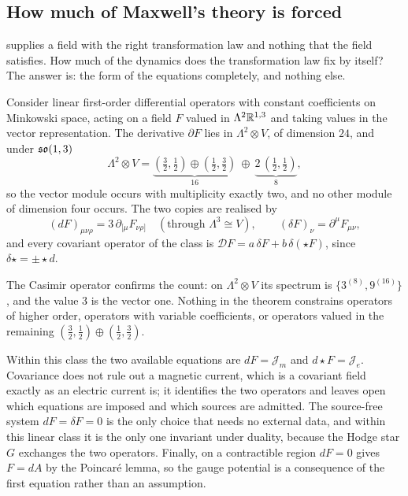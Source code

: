 \subsection{How much of Maxwell's theory is forced}
\label{sec:maxwell}

 supplies a field with the right transformation law and nothing that the field satisfies. How much of the
dynamics does the transformation law fix by itself? The answer is: the form of the equations completely, and nothing else.

\begin{theorem}
\label{thm:twoops}
Consider linear first-order differential operators with constant coefficients on Minkowski space, acting on a field $F$ valued in
$\Lambda^2\mathbb{R}^{1,3}$ and taking values in the vector representation. The derivative $\partial F$ lies in $\Lambda^2\otimes V$, of
dimension $24$, and under $\mathfrak{so}(1,3)$
\[
\Lambda^2\otimes V=\underbrace{(\tfrac32,\tfrac12)\oplus(\tfrac12,\tfrac32)}_{16}\ \oplus\ \underbrace{2\,(\tfrac12,\tfrac12)}_{8},
\]
so the vector module occurs with multiplicity exactly two, and no other module of dimension four occurs. The two copies are realised
by
\[
(dF)_{\mu\nu\rho}=3\,\partial_{[\mu}F_{\nu\rho]}\quad(\text{through }\Lambda^3\cong V),\qquad (\delta F)_\nu=\partial^\mu F_{\mu\nu},
\]
and every covariant operator of the class is $\mathcal DF=a\,\delta F+b\,\delta(\star F)$, since $\delta\star=\pm\star d$.
\end{theorem}

The Casimir operator confirms the count: on $\Lambda^2\otimes V$ its spectrum is $\{3^{(8)},9^{(16)}\}$, and the value $3$ is the
vector one. Nothing in the theorem constrains operators of higher order, operators with variable coefficients, or operators valued
in the remaining $(\tfrac32,\tfrac12)\oplus(\tfrac12,\tfrac32)$.

\begin{corollary}
\label{cor:maxwellform}
Within this class the two available equations are $dF=\mathcal J_m$ and $d\star F=\mathcal J_e$. Covariance does not rule out a
magnetic current, which is a covariant field exactly as an electric current is; it identifies the two operators and leaves open
which equations are imposed and which sources are admitted. The source-free system $dF=\delta F=0$ is the only choice that needs no
external data, and within this linear class it is the only one invariant under duality, because the Hodge star $G$ exchanges the two
operators. Finally, on a contractible region $dF=0$ gives $F=dA$ by the Poincar\'e lemma, so the gauge potential is a consequence of
the first equation rather than an assumption.
\end{corollary}

